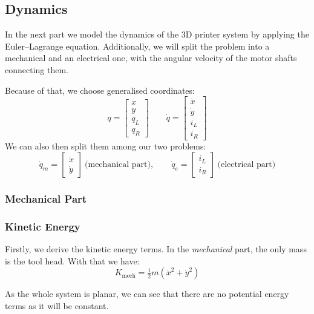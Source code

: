 \subsection{Dynamics}
In the next part we model the dynamics of the 3D printer system by applying the Euler--Lagrange equation. Additionally, we will split the problem into a mechanical and an electrical one, with the angular velocity of the motor shafts connecting them. 

Because of that, we choose generalised coordinates:
\begin{equation}
\label{eq:gen_coords}
q = \begin{bmatrix} x \\ y \\ q_L \\ q_R \end{bmatrix}
\qquad
\dot q = \begin{bmatrix} \dot x \\ \dot y \\ i_L \\ i_R \end{bmatrix}
\end{equation}
We can also then split them among our two problems:
\begin{equation}
\label{eq:gen_coords_split}
\dot q_m = \begin{bmatrix} \dot x \\ \dot y \end{bmatrix} \ \text{(mechanical part)},
\qquad
\dot q_e = \begin{bmatrix} i_L \\ i_R \end{bmatrix} \ \text{(electrical part)}
\end{equation}

\subsubsection{Mechanical Part}
\subsubsection*{Kinetic Energy}
Firstly, we derive the kinetic energy terms. In the \textit{mechanical} part, the only mass is the tool head. With that we have:
\begin{equation}
\label{eq:kinetic}
K_{\mathrm{mech}} = \tfrac{1}{2} m (\dot x^2 + \dot y^2)
\end{equation}

As the whole system is planar, we can see that there are no potential energy terms as it will be constant.

